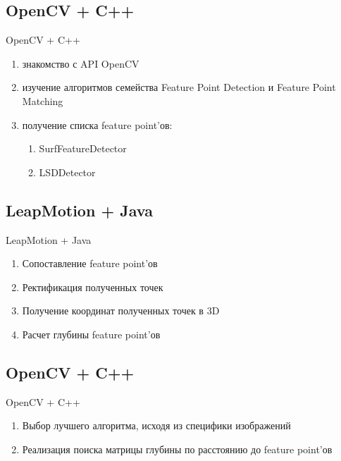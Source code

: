 \documentclass{beamer}
\begin{document}
\subsection{OpenCV + C++}
\begin{frame}[t]{OpenCV + C++}
	\begin{enumerate}
	\item знакомство с API OpenCV
	\item изучение алгоритмов семейства Feature Point Detection и Feature Point Matching
	\item
		получение списка feature point’ов:
		\begin{enumerate}
			\item SurfFeatureDetector
			\item LSDDetector
		\end{enumerate}
	\end{enumerate}
\end{frame}

\subsection{LeapMotion + Java}
\begin{frame}[t]{LeapMotion + Java}
	\begin{enumerate}
		\item Сопоставление feature point’ов
		\item Ректификация полученных точек
		\item Получение координат полученных точек в 3D
		\item Расчет глубины feature point’ов
	\end{enumerate}
\end{frame}

\subsection{OpenCV + C++}
\begin{frame}[t]{OpenCV + C++}
	\begin{enumerate}
	\item Выбор лучшего алгоритма, исходя из специфики изображений
	\item Реализация поиска матрицы глубины по расстоянию до feature point’ов
	\end{enumerate}
\end{frame}
\end{document}
